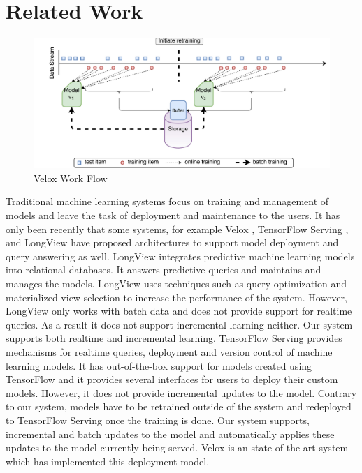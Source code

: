 \documentclass{vldb}
\begin{document}
\section{Related Work} \label{related-work}
\begin{figure}[!t]
\centering
\includegraphics[scale = 0.5]{../images/velox-1.pdf}
\caption{Velox Work Flow}
\label{fig:velox-work-flow}
\end{figure}
Traditional machine learning systems focus on training and management of models and leave the task of deployment and maintenance to the users. 
It has only been recently that some systems, for example Velox \cite{crankshaw2014missing}, TensorFlow Serving \cite{abadi2016tensorflow}, and LongView \cite{akdere2011case} have proposed architectures to support model deployment and query answering as well. 
LongView integrates predictive machine learning models into relational databases. 
It answers predictive queries and maintains and manages the models.
LongView uses techniques such as query optimization and materialized view selection to increase the performance of the system.
However, LongView only works with batch data and does not provide support for realtime queries. 
As a result it does not support incremental learning neither.
Our system supports both realtime and incremental learning.
TensorFlow Serving provides mechanisms for realtime queries, deployment and version control of machine learning models.
It has out-of-the-box support for models created using TensorFlow and it provides several interfaces for users to deploy their custom models.
However, it does not provide incremental updates to the model.
Contrary to our system, models have to be retrained outside of the system and redeployed to TensorFlow Serving once the training is done.
Our system supports, incremental and batch updates to the model and automatically applies these updates to the model currently being served.
Velox \cite{crankshaw2014missing} is an state of the art system which has implemented this deployment model.
\end{document}
